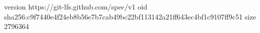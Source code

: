 version https://git-lfs.github.com/spec/v1
oid sha256:c9f7440e4f24eb8b56e7b7cab49bc22bf113142a21ff643ec4bf1c9107ff9c51
size 2796364
